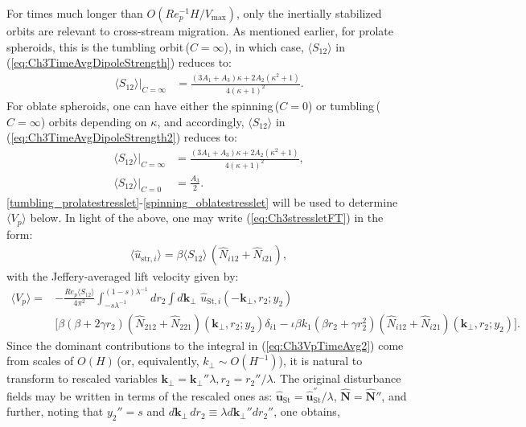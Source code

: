 \documentclass{jfm}
\begin{document}
For times much longer than $O(Re_p^{-1}H/V_\text{max})$, only the inertially stabilized orbits are relevant to cross-stream migration. As mentioned earlier, for prolate spheroids, this is the tumbling orbit\,($C=\infty$), in which case, $\langle S_{12}\rangle$ in (\ref{eq:Ch3TimeAvgDipoleStrength}) reduces to:
\begin{align}
\langle S_{12}\rangle|_{C=\infty} &= \frac{ (3 A_1+A_3)\kappa+2 A_2 (\kappa ^2+1)}{4 (\kappa +1)^2}. \label{tumbling_prolatestresslet}
\end{align}
For oblate spheroids, one can have either the spinning\,($C=0$) or tumbling\,($C=\infty$) orbits depending on $\kappa$, and accordingly, $\langle S_{12}\rangle$ in (\ref{eq:Ch3TimeAvgDipoleStrength2}) reduces to:
\begin{align}
\langle S_{12}\rangle|_{C=\infty} &= \frac{ (3 A_1+A_3)\kappa+2 A_2 (\kappa ^2+1)}{4 (\kappa +1)^2},\label{tumbling_oblatestresslet}\\
\langle S_{12}\rangle|_{C=0} &= \frac{A_3}{2}. \label{spinning_oblatestresslet}
\end{align}
\eqref{tumbling_prolatestresslet}-\eqref{spinning_oblatestresslet} will be used to determine $\langle V_p \rangle$ below. In light of the above, one may write (\ref{eq:Ch3stressletFT}) in the form:
\begin{align}
\langle\hat{u}_{\text{str},i}\rangle=\beta \langle S_{12}\rangle\,(\hat{N}_{i12}+\hat{N}_{i21}),
\label{eq:Ch3TimeAveragedActualVelocity}
\end{align}
with the Jeffery-averaged lift velocity given by: 
\begin{align}
\langle V_p\rangle =&-\frac{Re_p\langle S_{12}\rangle} {4\pi^2} \int_{-s\lambda^{-1}}^{(1-s)\lambda^{-1}} dr_2\int d\bm{k}_\perp\,\, \hat{u}_{\text{St},i} (-\bm{k}_\perp,r_2;y_2) \nonumber\\
&\big[\beta(\beta+2\gamma r_2)(\hat{N}_{212}+\hat{N}_{221}) (\bm{k}_\perp,r_2;y_2)\delta_{i1}-\iota \beta k_1(\beta r_2 +\gamma r_2^2) (\hat{N}_{i12}+\hat{N}_{i21}) (\bm{k}_\perp,r_2;y_2)\big]. \label{eq:Ch3VpTimeAvg2}
\end{align}
Since the dominant contributions to the integral in (\ref{eq:Ch3VpTimeAvg2}) come from scales of $O(H)$\,(or, equivalently, $k_\perp \sim O(H^{-1})$), it is natural to transform  to rescaled variables $\bm{k}_\perp=\bm{k}_\perp''\lambda, r_2=r_2''/\lambda$. The original disturbance fields may be written in terms of the rescaled ones as: $\hat{\bm{u}}_\text{St} =\hat{\bm{u}}_\text{St}^{''} /\lambda$, $\hat{\bm{N}}=\hat{\bm{N}}''$, and further, noting that $y_2''= s$ and $d\bm{k}_\perp\,dr_2\equiv \lambda d\bm{k}_\perp''dr_2''$, one obtains,
\end{document}
